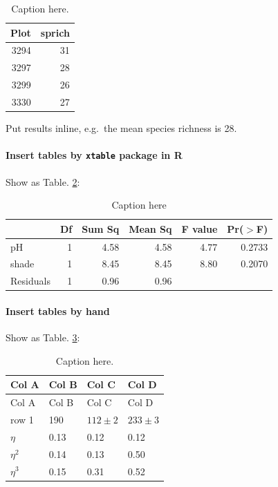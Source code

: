 \documentclass[12pt,]{article}
\let\oldparagraph\paragraph
\renewcommand{\paragraph}[1]{\oldparagraph{#1}\mbox{}}
\begin{document}
\begin{table}[t]

\caption{\label{tab:tableName}Caption here.}
\centering
\begin{tabular}{rr}
\toprule
Plot & sprich\\
\midrule
3294 & 31\\
3297 & 28\\
3299 & 26\\
3330 & 27\\
\bottomrule
\end{tabular}
\end{table}

Put results inline, e.g.~the mean species richness is 28.

\hypertarget{insert-tables-by-xtable-package-in-r}{%
\paragraph{\texorpdfstring{Insert tables by \texttt{xtable} package in
R}{Insert tables by xtable package in R}}\label{insert-tables-by-xtable-package-in-r}}

Show as Table. \ref{t:anova}:

\begin{table}[ht]
\centering
\caption{Caption here} 
\label{t:anova}
\begin{tabular}{lrrrrr}
  \toprule
 & Df & Sum Sq & Mean Sq & F value & Pr($>$F) \\ 
  \midrule
pH          & 1 & 4.58 & 4.58 & 4.77 & 0.2733 \\ 
  shade       & 1 & 8.45 & 8.45 & 8.80 & 0.2070 \\ 
  Residuals   & 1 & 0.96 & 0.96 &  &  \\ 
   \bottomrule
\end{tabular}
\end{table}

\hypertarget{insert-tables-by-hand}{%
\paragraph{Insert tables by hand}\label{insert-tables-by-hand}}

Show as Table. \ref{tab:byhand}:

\begin{longtable}[]{@{}llll@{}}
\caption{\label{tab:byhand} Caption here.}\tabularnewline
\toprule
Col A & Col B & Col C & Col D\tabularnewline
\midrule
\endfirsthead
\toprule
Col A & Col B & Col C & Col D\tabularnewline
\midrule
\endhead
row 1 & 190 & \(112 \pm 2\) & \(233 \pm 3\)\tabularnewline
\(\eta\) & 0.13 & 0.12 & 0.12\tabularnewline
\(\eta^2\) & 0.14 & 0.13 & 0.50\tabularnewline
\(\eta^3\) & 0.15 & 0.31 & 0.52\tabularnewline
\bottomrule
\end{longtable}
\end{document}
